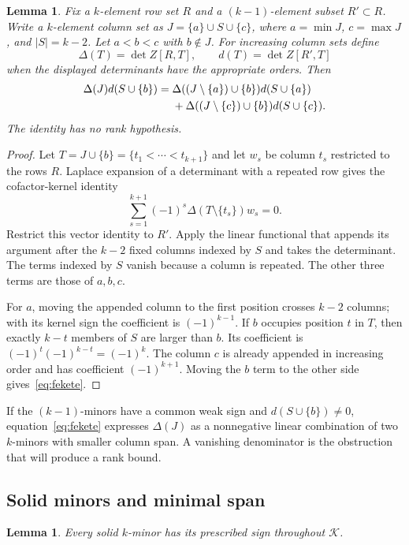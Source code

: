 \documentclass[11pt]{article}
\newtheorem{lemma}[theorem]{Lemma}
\theoremstyle{definition}
\theoremstyle{remark}
\numberwithin{equation}{section}
\newcommand{\K}{\mathcal K}
\begin{document}
\begin{lemma}\label{lem:fekete}
Fix a $k$-element row set $R$ and a $(k-1)$-element subset
$R'\subset R$. Write a $k$-element column set as
$J=\{a\}\cup S\cup\{c\}$, where $a=\min J$, $c=\max J$,
and $|S|=k-2$. Let $a<b<c$ with $b\notin J$. For increasing
column sets define
\[
 \Delta(T)=\det Z[R,T],\qquad d(T)=\det Z[R',T]
\]
when the displayed determinants have the appropriate orders.
Then
\begin{align}
 \Delta(J)d(S\cup\{b\})
 ={}&\Delta((J\setminus\{a\})\cup\{b\})d(S\cup\{a\})\notag\\
 &+\Delta((J\setminus\{c\})\cup\{b\})d(S\cup\{c\}).
 \label{eq:fekete}
\end{align}
The identity has no rank hypothesis.
\end{lemma}

\begin{proof}
Let $T=J\cup\{b\}=\{t_1<\cdots<t_{k+1}\}$ and let $w_s$
be column $t_s$ restricted to the rows $R$. Laplace expansion of
a determinant with a repeated row gives the cofactor-kernel
identity
\[
 \sum_{s=1}^{k+1}(-1)^s\Delta(T\setminus\{t_s\})w_s=0.
\]
Restrict this vector identity to $R'$. Apply the linear functional
that appends its argument after the $k-2$ fixed columns indexed
by $S$ and takes the determinant. The terms indexed by $S$
vanish because a column is repeated. The other three terms are
those of $a,b,c$.

For $a$, moving the appended column to the first position crosses
$k-2$ columns; with its kernel sign the coefficient is
$(-1)^{k-1}$. If $b$ occupies position $t$ in $T$, then exactly
$k-t$ members of $S$ are larger than $b$. Its coefficient is
$(-1)^t(-1)^{k-t}=(-1)^k$. The column $c$ is already appended
in increasing order and has coefficient $(-1)^{k+1}$. Moving
the $b$ term to the other side gives~\eqref{eq:fekete}.
\end{proof}

If the $(k-1)$-minors have a common weak sign and
$d(S\cup\{b\})\neq0$, equation~\eqref{eq:fekete} expresses
$\Delta(J)$ as a nonnegative linear combination of two $k$-minors
with smaller column span. A vanishing denominator is the obstruction
that will produce a rank bound.

\subsection{Solid minors and minimal span}

\begin{lemma}\label{lem:solid}
Every solid $k$-minor has its prescribed sign throughout $\K$.
\end{lemma}
\end{document}
